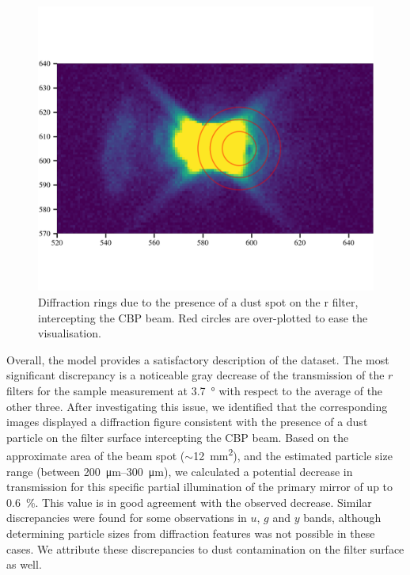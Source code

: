\begin{figure}
  \centering
  \includegraphics[width=1\linewidth]{fig/diffraction_dust.png}
  \caption{Diffraction rings due to the presence of a dust spot on the
    r filter, intercepting the CBP beam. Red circles are over-plotted
    to ease the visualisation.}
  \label{fig:dust}
\end{figure}


Overall, the model provides a satisfactory description of the
dataset. The most significant discrepancy is a noticeable gray
decrease of the transmission of the $r$ filters for the sample
measurement at \SI{3.7}{\degree} with respect to the average of the
other three.  After investigating this issue, we identified that the
corresponding images displayed a diffraction figure consistent with
the presence of a dust particle on the filter surface intercepting the
CBP beam.  Based on the approximate area of the beam spot
($\sim$\SI{12}{\milli\metre\squared}), and the estimated particle size range (between
\SIrange{200}{300}{\micro\metre}), we calculated a potential decrease
in transmission for this specific partial illumination of the primary
mirror of up to \SI{0.6}{\percent}. This value is in good agreement
with the observed decrease. Similar discrepancies were found for some
observations in $u$, $g$ and $y$ bands, although determining particle
sizes from diffraction features was not possible in these cases. We
attribute these discrepancies to dust contamination on the filter
surface as well.

